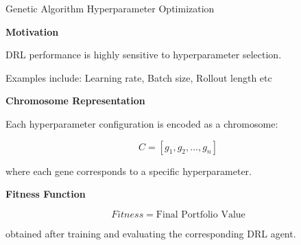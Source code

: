 \documentclass[10pt]{beamer}
\begin{document}
\begin{frame}{Genetic Algorithm Hyperparameter Optimization}

\textbf{Motivation}

\vspace{0.2cm}

DRL performance is highly sensitive to hyperparameter selection.

\vspace{0.2cm}

Examples include: Learning rate, Batch size, Rollout length etc

\vspace{0.3cm}

\textbf{Chromosome Representation}

Each hyperparameter configuration is encoded as a chromosome:

\[
C =
[g_1,g_2,\dots,g_n]
\]

where each gene corresponds to a specific hyperparameter.

\vspace{0.3cm}

\textbf{Fitness Function}

\[
Fitness = \text{Final Portfolio Value}
\]

obtained after training and evaluating the corresponding DRL agent.

\end{frame}
\end{document}
